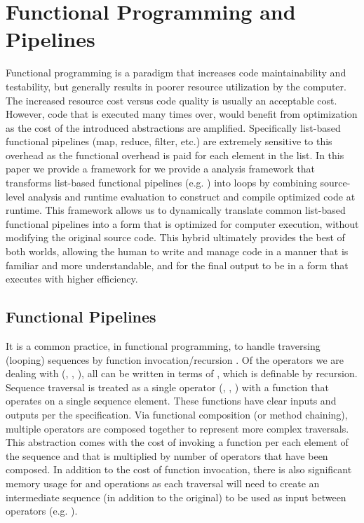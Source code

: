 \section{Functional Programming and Pipelines}
Functional programming is a paradigm that increases code maintainability and testability, but generally results in poorer resource utilization by the computer.  The increased resource cost versus code quality is usually an acceptable cost. However, code that is executed many times over, would benefit from optimization as the cost of the introduced abstractions are amplified. Specifically list-based functional pipelines (map, reduce, filter, etc.) are extremely sensitive to this overhead as the functional overhead is paid for each element in the list. In this paper we provide a framework for we provide a \javascript analysis framework that transforms list-based functional pipelines (e.g. ) into  loops by combining source-level analysis and runtime evaluation to construct and compile optimized code at runtime.  This framework allows us to dynamically translate common list-based functional pipelines into a form that is optimized for computer execution, without modifying the original source code. This hybrid ultimately provides the best of both worlds, allowing the human to write and manage code in a manner that is familiar and more understandable, and for the final output to be in a form that executes with higher efficiency.

\subsection{Functional Pipelines}
It is a common practice, in functional programming, to handle traversing (looping) sequences by function invocation/recursion \cite{recurse16}.  Of the operators we are dealing with (, , ), all can be written in terms of , which is definable by recursion. Sequence traversal is treated as a single operator (, , ) with a function that operates on a single sequence element. These functions have clear inputs and outputs per the \javascript specification.  Via functional composition (or method chaining), multiple operators are composed together to represent more complex traversals.  This abstraction comes with the cost of invoking a function per each element of the sequence and that is multiplied by number of operators that have been composed. In addition to the cost of function invocation, there is also significant memory usage for  and  operations as each traversal will need to create an intermediate sequence (in addition to the original) to be used as input between operators (e.g. ).  

